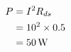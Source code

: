 \subsection{}

\begin{align*}
P & = I^2 R_{ds} \\
  & = 10^2 \times 0.5 \\
  & = \unit[50]{W}
\end{align*}